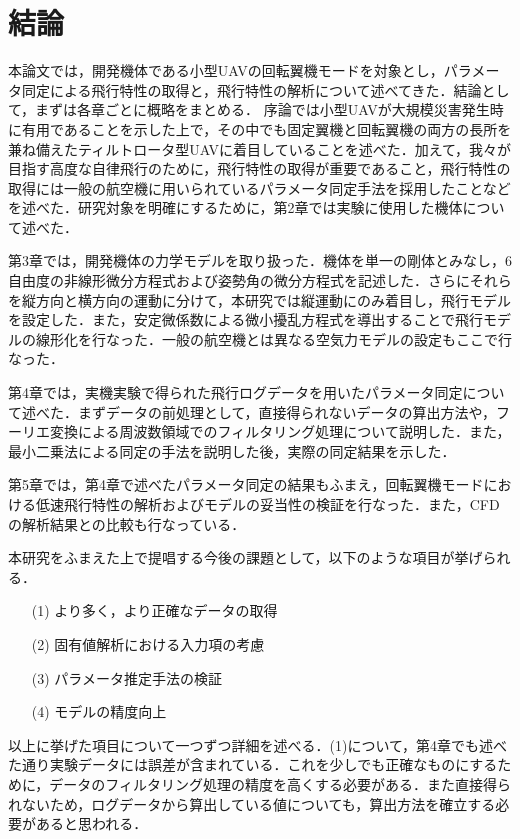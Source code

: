 
\chapter{結論}
\label{conclusion}

本論文では，開発機体である小型UAVの回転翼機モードを対象とし，パラメータ同定による飛行特性の取得と，飛行特性の解析について述べてきた．結論として，まずは各章ごとに概略をまとめる．
序論では小型UAVが大規模災害発生時に有用であることを示した上で，その中でも固定翼機と回転翼機の両方の長所を兼ね備えたティルトロータ型UAVに着目していることを述べた．加えて，我々が目指す高度な自律飛行のために，飛行特性の取得が重要であること，飛行特性の取得には一般の航空機に用いられているパラメータ同定手法を採用したことなどを述べた．研究対象を明確にするために，第2章では実験に使用した機体について述べた．

第3章では，開発機体の力学モデルを取り扱った．機体を単一の剛体とみなし，6自由度の非線形微分方程式および姿勢角の微分方程式を記述した．さらにそれらを縦方向と横方向の運動に分けて，本研究では縦運動にのみ着目し，飛行モデルを設定した．また，安定微係数による微小擾乱方程式を導出することで飛行モデルの線形化を行なった．一般の航空機とは異なる空気力モデルの設定もここで行なった．

第4章では，実機実験で得られた飛行ログデータを用いたパラメータ同定について述べた．まずデータの前処理として，直接得られないデータの算出方法や，フーリエ変換による周波数領域でのフィルタリング処理について説明した．また，最小二乗法による同定の手法を説明した後，実際の同定結果を示した．

第5章では，第4章で述べたパラメータ同定の結果もふまえ，回転翼機モードにおける低速飛行特性の解析およびモデルの妥当性の検証を行なった．また，CFDの解析結果との比較も行なっている．

\vspace{5pt}

本研究をふまえた上で提唱する今後の課題として，以下のような項目が挙げられる．
\begin{itemize}
  \item[(1)] より多く，より正確なデータの取得
  \item[(2)] 固有値解析における入力項の考慮
  \item[(3)] パラメータ推定手法の検証
  \item[(4)] モデルの精度向上
\end{itemize}

以上に挙げた項目について一つずつ詳細を述べる．(1)について，第4章でも述べた通り実験データには誤差が含まれている．これを少しでも正確なものにするために，データのフィルタリング処理の精度を高くする必要がある．また直接得られないため，ログデータから算出している値についても，算出方法を確立する必要があると思われる．

